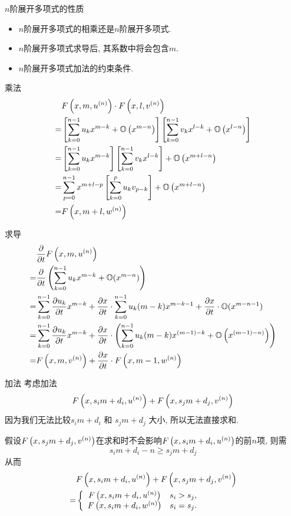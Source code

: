 \begin{frame}{$n$阶展开多项式的性质}
\begin{itemize}
\item $n$阶展开多项式的相乘还是$n$阶展开多项式.
\item $n$阶展开多项式求导后, 其系数中将会包含$m$.
\item $n$阶展开多项式加法的约束条件.
\end{itemize}
\end{frame}

\begin{frame}{乘法}
\[
\begin{split}
& F\left(x,m,u ^{(n)}\right)\cdot F\left(x,l,v^{(n)}\right) \\
=& \left[\sum_{k=0}^{n-1}{u_k x^{m-k}}+\mathbb O\left(x^{m-n}\right)\right]\left[\sum_{k=0}^{n-1}{v_k x^{l-k}}+\mathbb O\left(x^{l-n}\right)\right] \\
=& \left[\sum_{k=0}^{n-1}{u_k x^{m-k}}\right]\left[\sum_{k=0}^{n-1}{v_k x^{l-k}}\right]+\mathbb O\left(x^{m+l-n}\right) \\
=& \sum_{p=0}^{n-1}{x^{m+l-p}\left[\sum_{k=0}^p{u_k v_{p-k}}\right]}+\mathbb O\left(x^{m+l-n}\right) \\
=& F\left(x,m+l,w^{(n)}\right) 
\end{split} 
\]
\end{frame}

\begin{frame}{求导}
\[
\begin{split}
& \frac{\partial}{\partial t}F\left(x,m,u^{(n)}\right)  \\
=& \frac{\partial}{\partial t}\left(\sum_{k=0}^{n-1}{u_k x^{m-k}}+\mathbb O(x^{m-n})\right) \\
=& \sum_{k=0}^{n-1}{\frac{\partial u_k}{\partial t}x^{m-k}}+\frac{\partial x}{\partial t}\cdot\sum_{k=0}^{n-1}{u_k (m-k) x^{m-k-1}}+\frac{\partial x}{\partial t}\cdot\mathbb O(x^{m-n-1}) \\
=& \sum_{k=0}^{n-1}{\frac{\partial u_k}{\partial t}x^{m-k}}+\frac{\partial x}{\partial t}\cdot\left(\sum_{k=0}^{n-1}{u_k (m-k) x^{(m-1)-k}}+\mathbb O\left(x^{(m-1)-n)}\right)\right) \\ 
=& F\left(x,m,v^{(n)}\right)+\frac{\partial x}{\partial t}\cdot F\left(x,m-1,w^{(n)}\right) 
\end{split}
\]
\end{frame}


\begin{frame}{加法}
考虑加法 
\[
    F\left(x,s_i m+d_i,u^{(n)}\right)+F\left(x,s_j m+d_j,v^{(n)}\right)
\]
因为我们无法比较$s_i m + d_i$ 和 $s_j m + d_j$ 大小, 所以无法直接求和. 

假设$F\left(x,s_j m+d_j,v^{(n)}\right)$在求和时不会影响$F\left(x,s_i m+d_i,u^{(n)}\right)$的前$n$项, 则需 
\[
    s_i m+d_i - n \ge s_j m+d_j 
\]
从而 
\[
\begin{split}
&F\left(x,s_i m+d_i,u^{(n)}\right)+F\left(x,s_j m+d_j,v^{(n)}\right) \\
=&\left\{
\begin{array}{cl}
    F\left(x,s_i m+d_i,u^{(n)}\right) & s_i>s_j,            \\
    F\left(x,s_i m+d_i,w^{(n)}\right) & s_i=s_j.
\end{array}
\right.
\end{split}
\]
\end{frame}

